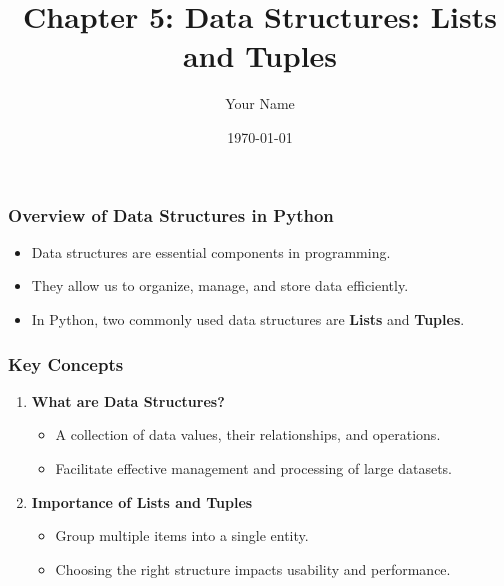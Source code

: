 \documentclass{beamer}
\title{Chapter 5: Data Structures: Lists and Tuples}
\author{Your Name}
\institute{Your Institution}
\date{\today}
\begin{document}
\frame{\titlepage}

\begin{frame}[fragile]
    \titlepage
\end{frame}

\begin{frame}[fragile]
    \frametitle{Overview of Data Structures in Python}
    \begin{itemize}
        \item Data structures are essential components in programming.
        \item They allow us to organize, manage, and store data efficiently.
        \item In Python, two commonly used data structures are \textbf{Lists} and \textbf{Tuples}.
    \end{itemize}
\end{frame}

\begin{frame}[fragile]
    \frametitle{Key Concepts}
    \begin{enumerate}
        \item \textbf{What are Data Structures?}
            \begin{itemize}
                \item A collection of data values, their relationships, and operations.
                \item Facilitate effective management and processing of large datasets.
            \end{itemize}
        \item \textbf{Importance of Lists and Tuples}
            \begin{itemize}
                \item Group multiple items into a single entity.
                \item Choosing the right structure impacts usability and performance.
            \end{itemize}
    \end{enumerate}
\end{frame}
\end{document}
